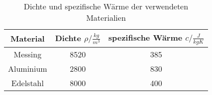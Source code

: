 \begin{table}[!htp]
\centering
\caption{Dichte und spezifische Wärme der verwendeten Materialien \cite[2]{V204}}
\label{tab:materialkonst}
\begin{tabular}{c c c}
\toprule
{Material} & { Dichte $\rho / \frac{kg}{m^3}$} & { spezifische Wärme $c / \frac{J}{kgK}$} \\
\midrule
Messing & 8520 & 385 \\
Aluminium & 2800 & 830 \\
Edelstahl & 8000 & 400 \\
\bottomrule
\end{tabular}
\end{table}